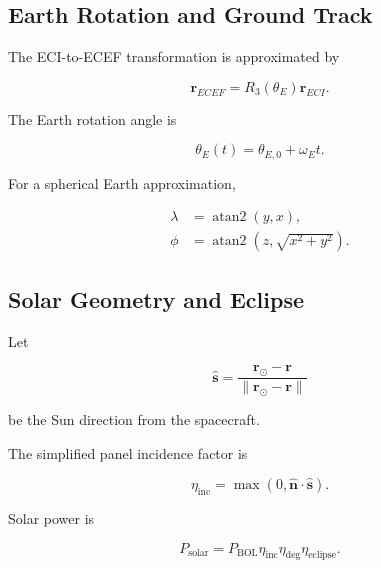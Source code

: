 \documentclass[11pt,a4paper]{article}
\newcommand{\vect}[1]{\bm{#1}}
\begin{document}

\subsection{Earth Rotation and Ground Track}

The ECI-to-ECEF transformation is approximated by

\begin{equation}
\vect r_{ECEF}
=
R_3(\theta_E)
\vect r_{ECI}.
\end{equation}

The Earth rotation angle is

\begin{equation}
\theta_E(t)
=
\theta_{E,0}
+
\omega_E t.
\end{equation}

For a spherical Earth approximation,

\begin{align}
\lambda
&=
\operatorname{atan2}(y,x),\\
\phi
&=
\operatorname{atan2}
\left(
z,
\sqrt{x^2+y^2}
\right).
\end{align}


\subsection{Solar Geometry and Eclipse}

Let

\begin{equation}
\hat{\vect s}
=
\frac{\vect r_{\odot}-\vect r}
{\|\vect r_{\odot}-\vect r\|}
\end{equation}

be the Sun direction from the spacecraft.

The simplified panel incidence factor is

\begin{equation}
\eta_{\mathrm{inc}}
=
\max
\left(
0,
\hat{\vect n}\cdot\hat{\vect s}
\right).
\end{equation}

Solar power is

\begin{equation}
P_{\mathrm{solar}}
=
P_{\mathrm{BOL}}
\eta_{\mathrm{inc}}
\eta_{\mathrm{deg}}
\eta_{\mathrm{eclipse}}.
\end{equation}
\end{document}
